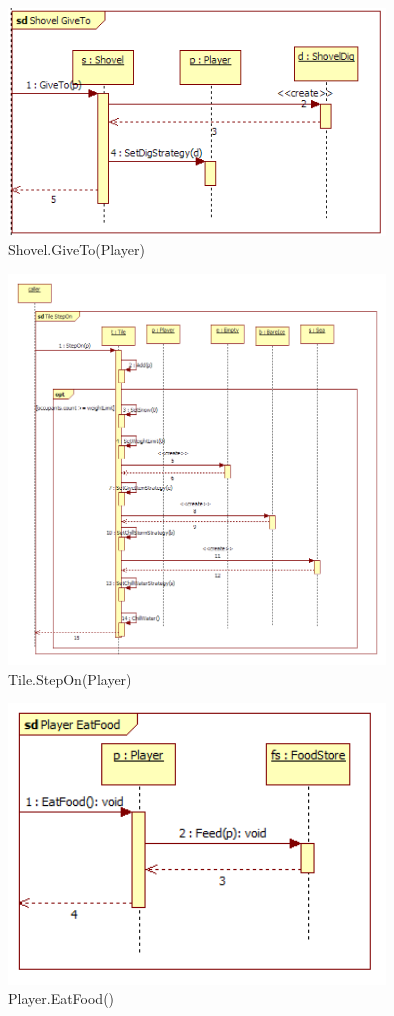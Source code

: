 \begin{figure}[H]
	\begin{center}
		\includegraphics[width=10cm]{chapters/chapter03/seqdiag/Shovel_GiveTo.png}
		\caption{Shovel.GiveTo(Player)}
		\label{fig:ShovelGiveTo}
	\end{center}
\end{figure}
\begin{figure}[H]
	\begin{center}
		\includegraphics[width=10cm]{chapters/chapter03/seqdiag/Tile_StepOn.png}
		\caption{Tile.StepOn(Player)}
		\label{fig:TileStepOn}
	\end{center}
\end{figure}
\begin{figure}[H]
	\begin{center}
		\includegraphics[width=10cm]{chapters/chapter03/seqdiag/Player_EatFood.png}
		\caption{Player.EatFood()}
		\label{fig:PlayerEatFood}
	\end{center}
\end{figure}
